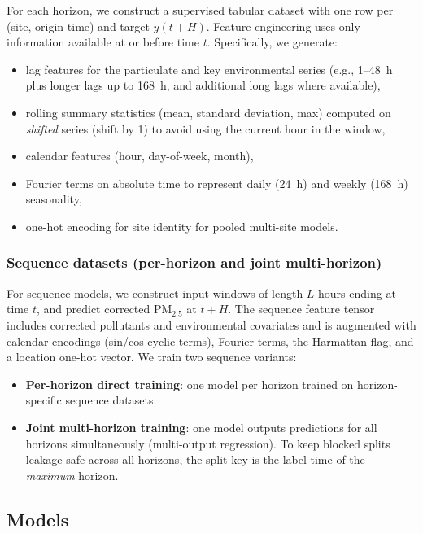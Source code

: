 \documentclass[a4paper,fleqn]{cas-sc}
\begin{document}
For each horizon, we construct a supervised tabular dataset with one row per (site, origin time) and target \(y(t+H)\). Feature engineering uses only information available at or before time \(t\). Specifically, we generate:
\begin{itemize}
    \item lag features for the particulate and key environmental series (e.g., 1--48~h plus longer lags up to 168~h, and additional long lags where available),
    \item rolling summary statistics (mean, standard deviation, max) computed on \emph{shifted} series (shift by 1) to avoid using the current hour in the window,
    \item calendar features (hour, day-of-week, month),
    \item Fourier terms on absolute time to represent daily (24~h) and weekly (168~h) seasonality,
    \item one-hot encoding for site identity for pooled multi-site models.
\end{itemize}

\subsubsection{Sequence datasets (per-horizon and joint multi-horizon)}

For sequence models, we construct input windows of length \(L\) hours ending at time \(t\), and predict corrected PM$_{2.5}$ at \(t+H\). The sequence feature tensor includes corrected pollutants and environmental covariates and is augmented with calendar encodings (sin/cos cyclic terms), Fourier terms, the Harmattan flag, and a location one-hot vector. We train two sequence variants:
\begin{itemize}
    \item \textbf{Per-horizon direct training}: one model per horizon trained on horizon-specific sequence datasets.
    \item \textbf{Joint multi-horizon training}: one model outputs predictions for all horizons simultaneously (multi-output regression). To keep blocked splits leakage-safe across all horizons, the split key is the label time of the \emph{maximum} horizon.
\end{itemize}

\subsection{Models}
\end{document}
